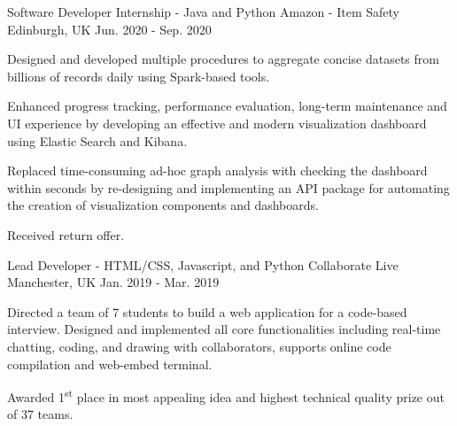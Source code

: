 \begin{cventries}
  \cventry
    {Software Developer Internship - Java and Python} %
    {Amazon - Item Safety} %
    {Edinburgh, UK} %
    {Jun. 2020 - Sep. 2020} %
    {
      \begin{cvitems} %
        \item {Designed and developed multiple procedures to aggregate concise datasets from  billions of records daily using Spark-based tools.}
        \item{Enhanced progress tracking, performance evaluation, long-term maintenance and UI experience by developing an effective and modern visualization dashboard using Elastic Search and Kibana.}
        \item {Replaced time-consuming ad-hoc graph analysis with checking the dashboard within seconds by re-designing and implementing an API package for automating the creation of visualization components and dashboards.}
        \item {Received return offer.}
      \end{cvitems}
    }

  \cventry
    {Lead Developer - HTML/CSS, Javascript, and Python} %
    {Collaborate Live} %
    {Manchester, UK} %
    {Jan. 2019 - Mar. 2019} %
    {
      \begin{cvitems} %
        \item {Directed a team of 7 students to build a web application for a code-based interview. Designed and implemented all core functionalities including real-time chatting, coding, and drawing with collaborators, supports online code compilation and web-embed terminal.}
        \item {Awarded 1\textsuperscript{st} place in most appealing idea and highest technical quality prize out of 37 teams.}
      \end{cvitems}
    }
\end{cventries}
